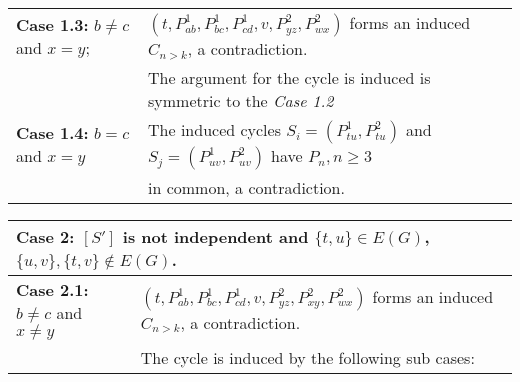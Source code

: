 \documentclass[runningheads]{llncs}
\begin{document}
\begin{table}[H]
\begin{tabular}{|l|l|}
\textbf{Case 1.3:} $b \neq c$ and $x = y$; & $(t, P_{ab}^{1}, P_{bc}^{1}, P_{cd}^{1}, v, P_{yz}^{2}, P_{wx}^{2})$ forms an induced $C_{n >k}$, a contradiction. \\
& The argument for the cycle is induced is symmetric to the \emph{Case 1.2}\\ \hline

\textbf{Case 1.4:} $b = c$ and $x = y$ & The induced cycles $S_i= (P_{tu}^{1},P_{tu}^{2})$ and $S_j=(P_{uv}^{1},P_{uv}^{2})$ have $P_n, n \geq 3$ \\
& in common, a contradiction.\\ \hline
\end{tabular}
\vspace{-0.8cm}
\end{table}

\begin{table}[H]
\begin{tabular}{|l|l|}
\multicolumn{2}{l}{\textbf{Case 2:} $[S']$ is not independent and $\{t,u\} \in E(G)$, $\{u,v\},\{t,v\} \notin E(G)$.} \\ \hline
\textbf{Case 2.1:} $b\neq c$ and $x \neq y$ & $(t, P_{ab}^{1}, P_{bc}^{1}, P_{cd}^{1}, v, P_{yz}^{2}, P_{xy}^{2}, P_{wx}^{2})$ forms an induced $C_{n >k}$, a contradiction. \\
&	The cycle is induced by the following sub cases:\\ \cline{2-2}


\end{tabular}
\end{table}
\end{document}
